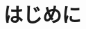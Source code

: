 \documentclass[11pt]{jarticle}
\begin{document}

\tableofcontents
\newpage

\section{はじめに}
\end{document}
